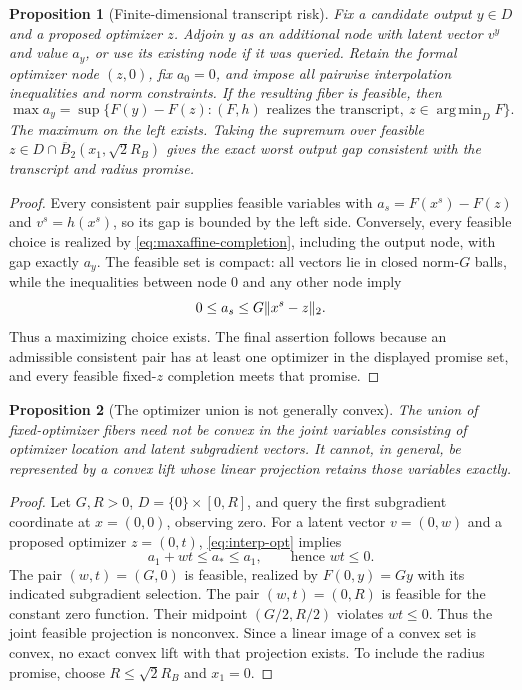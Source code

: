 \documentclass[11pt]{article}
\numberwithin{equation}{section}
\newtheorem{proposition}[proposition]{Proposition}
\theoremstyle{definition}
\theoremstyle{remark}
\DeclareMathOperator{\argmin}{arg\,min}
\DeclarePairedDelimiter{\norm}{\lVert}{\rVert}
\begin{document}
\begin{proposition}[Finite-dimensional transcript risk]\label{prop:transcript-risk}
Fix a candidate output $y\in D$ and a proposed optimizer $z$. Adjoin $y$ as an additional node with latent vector $v^y$ and value $a_y$, or use its existing node if it was queried. Retain the formal optimizer node $(z,0)$, fix $a_0=0$, and impose all pairwise interpolation inequalities and norm constraints. If the resulting fiber is feasible, then
\begin{equation}\label{eq:exact-transcript-risk}
\max a_y
=\sup\{F(y)-F(z):(F,h)\text{ realizes the transcript},\ z\in\argmin_DF\}.
\end{equation}
The maximum on the left exists. Taking the supremum over feasible $z\in D\cap\overline B_2(x_1,\sqrt2R_B)$ gives the exact worst output gap consistent with the transcript and radius promise.
\end{proposition}
\begin{proof}
Every consistent pair supplies feasible variables with $a_s=F(x^s)-F(z)$ and $v^s=h(x^s)$, so its gap is bounded by the left side. Conversely, every feasible choice is realized by \eqref{eq:maxaffine-completion}, including the output node, with gap exactly $a_y$. The feasible set is compact: all vectors lie in closed norm-$G$ balls, while the inequalities between node 0 and any other node imply
\[
0\le a_s\le G\norm{x^s-z}_2.
\]
Thus a maximizing choice exists. The final assertion follows because an admissible consistent pair has at least one optimizer in the displayed promise set, and every feasible fixed-$z$ completion meets that promise.
\end{proof}

\begin{proposition}[The optimizer union is not generally convex]\label{prop:nonconvex-fibers}
The union of fixed-optimizer fibers need not be convex in the joint variables consisting of optimizer location and latent subgradient vectors. It cannot, in general, be represented by a convex lift whose linear projection retains those variables exactly.
\end{proposition}
\begin{proof}
Let $G,R>0$, $D=\{0\}\times[0,R]$, and query the first subgradient coordinate at $x=(0,0)$, observing zero. For a latent vector $v=(0,w)$ and a proposed optimizer $z=(0,t)$, \eqref{eq:interp-opt} implies
\[
a_1+wt\le a_*\le a_1,\qquad\text{hence }wt\le0.
\]
The pair $(w,t)=(G,0)$ is feasible, realized by $F(0,y)=Gy$ with its indicated subgradient selection. The pair $(w,t)=(0,R)$ is feasible for the constant zero function. Their midpoint $(G/2,R/2)$ violates $wt\le0$. Thus the joint feasible projection is nonconvex. Since a linear image of a convex set is convex, no exact convex lift with that projection exists. To include the radius promise, choose $R\le\sqrt2R_B$ and $x_1=0$.
\end{proof}
\end{document}
